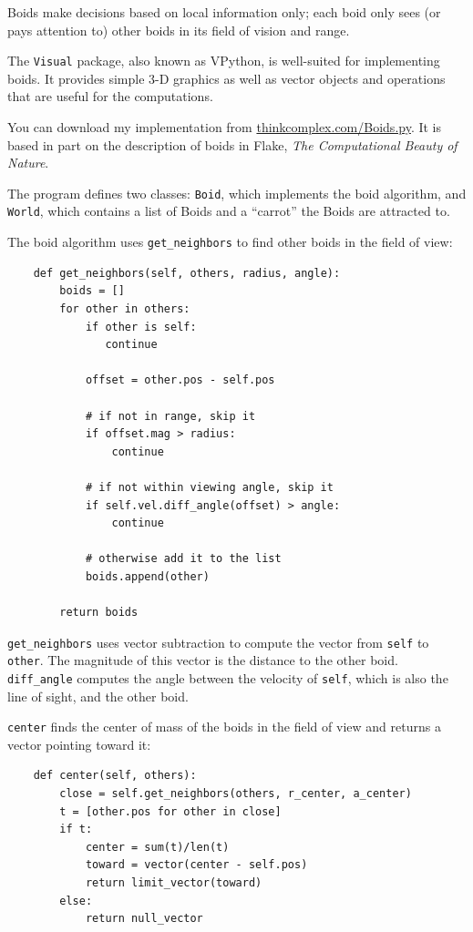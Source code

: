 \documentclass[10pt]{book}
\begin{document}
Boids make decisions based on local information only; each boid
only sees (or pays attention to) other boids in its field of
vision and range.

The {\tt Visual} package, also known as VPython, is well-suited
for implementing boids.  It provides simple 3-D graphics as
well as vector objects and operations that are useful for the
computations.

You can download my implementation from
\url{thinkcomplex.com/Boids.py}.  It is based in part
on the description of boids in Flake, {\em The Computational
Beauty of Nature}.

The program defines two classes: {\tt Boid}, which implements the boid
algorithm, and {\tt World}, which contains a list of Boids and a
``carrot'' the Boids are attracted to.

The boid algorithm uses \verb"get_neighbors" to find other
boids in the field of view:

\begin{verbatim}
    def get_neighbors(self, others, radius, angle):
        boids = []
        for other in others:
            if other is self:
               continue

            offset = other.pos - self.pos

            # if not in range, skip it
            if offset.mag > radius:
                continue

            # if not within viewing angle, skip it
            if self.vel.diff_angle(offset) > angle:
                continue

            # otherwise add it to the list
            boids.append(other)

        return boids
\end{verbatim}

\verb"get_neighbors" uses vector subtraction to compute the
vector from {\tt self} to {\tt other}.  The magnitude of
this vector is the distance to the other boid.  \verb"diff_angle"
computes the angle between the velocity of {\tt self}, which
is also the line of sight, and the other boid.

{\tt center} finds the center of mass of the boids in the
field of view and returns a vector pointing toward it:

\begin{verbatim}
    def center(self, others):
        close = self.get_neighbors(others, r_center, a_center)
        t = [other.pos for other in close]
        if t:
            center = sum(t)/len(t)
            toward = vector(center - self.pos)
            return limit_vector(toward)
        else:
            return null_vector
\end{verbatim}
\end{document}
